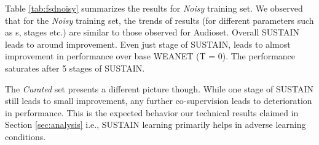 \documentclass{article}
\begin{document}
Table \ref{tab:fsdnoisy} summarizes the results for \emph{Noisy} training set. We observed that for the \emph{Noisy} training set, the trends of results (for different parameters such as s, stages etc.) are similar to those observed for Audioset.  Overall SUSTAIN leads to around  improvement. Even just  stage of SUSTAIN, leads to almost  improvement in performance over base WEANET (T = 0). The performance saturates after 5 stages of SUSTAIN. 


The \emph{Curated} set presents a different picture though. While one stage of SUSTAIN still leads to small improvement, any further co-supervision leads to deterioration in performance. This is the expected behavior our technical results claimed in Section \ref{sec:analysis} i.e., SUSTAIN learning primarily helps in adverse learning conditions. 



\begin{table}[t!]
  \centering
    \caption{Performance when trained on FSDKaggle-Curated set. Last row last column shows  for each stage. }
  \label{tab:fsdclean}\end{table}
\end{document}
